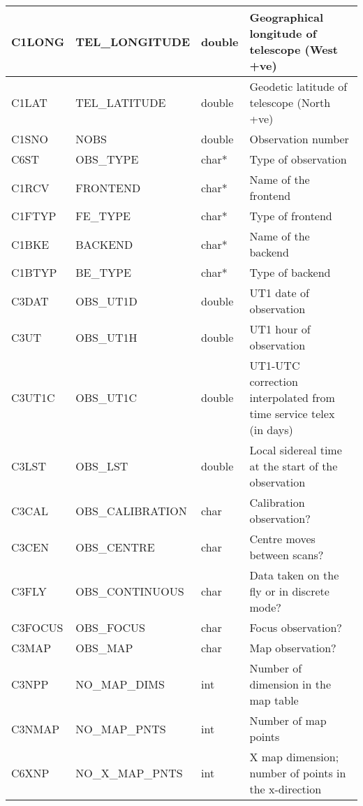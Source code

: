 \documentclass[twoside,11pt,nolof]{starlink}
\begin{document}
\begin {longtable}{|p{38mm}|p{42mm}|p{11mm}|p{55mm}|}
\hline \label{GSDVars:telLongitude}C1LONG & TEL\_LONGITUDE & double & Geographical longitude of telescope (West +ve)\\
\hline \label{GSDVars:telLatitude}C1LAT & TEL\_LATITUDE & double & Geodetic latitude of telescope (North +ve)\\
\hline \label{GSDVars:nObs}C1SNO & NOBS & double & Observation number\\
\hline \label{GSDVars:obsType}C6ST & OBS\_TYPE & char* & Type of observation\\
\hline \label{GSDVars:frontend}C1RCV & FRONTEND & char* & Name of the frontend\\
\hline \label{GSDVars:FEType}C1FTYP & FE\_TYPE & char* & Type of frontend\\
\hline \label{GSDVars:backend}C1BKE & BACKEND & char* & Name of the backend\\
\hline \label{GSDVars:BEType}C1BTYP & BE\_TYPE & char* & Type of backend\\
\hline \label{GSDVars:obsUT1d}C3DAT & OBS\_UT1D & double & UT1 date of observation\\
\hline \label{GSDVars:obsUT1h}C3UT & OBS\_UT1H & double & UT1 hour of observation\\
\hline \label{GSDVars:obsUT1C}C3UT1C & OBS\_UT1C & double & UT1-UTC correction interpolated from time service telex (in days)\\
\hline \label{GSDVars:obsLST}C3LST & OBS\_LST & double & Local sidereal time at the start of the observation\\
\hline \label{GSDVars:obsCalibration}C3CAL & OBS\_CALIBRATION & char & Calibration observation?\\
\hline \label{GSDVars:obsCentre}C3CEN & OBS\_CENTRE & char & Centre moves between scans?\\
\hline \label{GSDVars:obsContinuous}C3FLY & OBS\_CONTINUOUS & char & Data taken on the fly or in discrete mode?\\
\hline \label{GSDVars:obsFocus}C3FOCUS & OBS\_FOCUS & char & Focus observation?\\
\hline \label{GSDVars:obsMap}C3MAP & OBS\_MAP & char & Map observation?\\
\hline \label{GSDVars:nMapDims}C3NPP & NO\_MAP\_DIMS & int & Number of dimension in the map table\\
\hline \label{GSDVars:nMapPts}C3NMAP & NO\_MAP\_PNTS & int & Number of map points\\
\hline \label{GSDVars:nMapPtsX}C6XNP & NO\_X\_MAP\_PNTS & int & X map dimension; number of points in the x-direction\\

\end{longtable}
\end{document}
